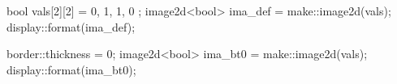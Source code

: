 bool vals[2][2] = { {0, 1},
		    {1, 0} };
image2d<bool> ima_def = make::image2d(vals);
display::format(ima_def);

border::thickness = 0;
image2d<bool> ima_bt0 = make::image2d(vals);
display::format(ima_bt0);
